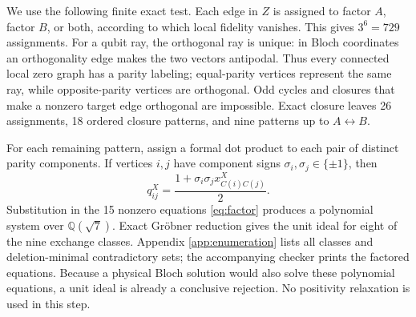 \documentclass[11pt]{article}
\begin{document}
We use the following finite exact test.  Each edge in $Z$ is assigned to
factor $A$, factor $B$, or both, according to which local fidelity vanishes.
This gives $3^6=729$ assignments.  For a qubit ray, the orthogonal ray is
unique: in Bloch coordinates an orthogonality edge makes the two vectors
antipodal.  Thus every connected local zero graph has a parity labeling;
equal-parity vertices represent the same ray, while opposite-parity vertices
are orthogonal.  Odd cycles and closures that make a nonzero target edge
orthogonal are impossible.  Exact closure leaves 26 assignments, 18 ordered
closure patterns, and nine patterns up to $A\leftrightarrow B$.

For each remaining pattern, assign a formal dot product to each pair of
distinct parity components.  If vertices $i,j$ have component signs
$\sigma_i,\sigma_j\in\{\pm1\}$, then
\begin{equation}
 q_{ij}^X=\frac{1+\sigma_i\sigma_j x^X_{C(i)C(j)}}{2}.
                                                               \label{eq:componentq}
\end{equation}
Substitution in the 15 nonzero equations \eqref{eq:factor} produces a
polynomial system over $\mathbb Q(\sqrt7)$.  Exact Gr\"obner reduction gives
the unit ideal for eight of the nine exchange classes.  Appendix
\ref{app:enumeration} lists all classes and deletion-minimal contradictory
sets; the accompanying checker prints the factored equations.  Because a
physical Bloch solution would also solve these polynomial equations, a unit
ideal is already a conclusive rejection.  No positivity relaxation is used in
this step.
\end{document}
